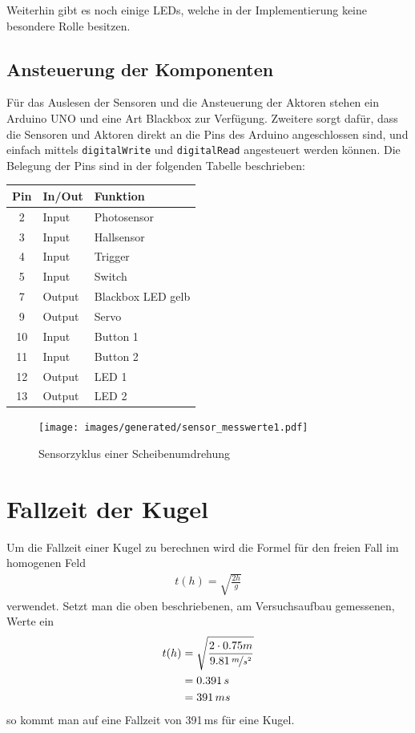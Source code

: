 Weiterhin gibt es noch einige LEDs, welche in der Implementierung keine besondere Rolle besitzen.

\subsection{Ansteuerung der Komponenten}
Für das Auslesen der Sensoren und die Ansteuerung der Aktoren stehen ein Arduino UNO und eine Art Blackbox zur Verfügung.
Zweitere sorgt dafür, dass die Sensoren und Aktoren direkt an die Pins des Arduino angeschlossen sind, und einfach mittels \texttt{digitalWrite} und \texttt{digitalRead} angesteuert werden können.
Die Belegung der Pins sind in der folgenden Tabelle beschrieben:


\begin{center}
\begin{tabular}{cll} 
	\textbf{Pin} 	& \textbf{In/Out} & \textbf{Funktion}	\\
	\toprule
	2 &	Input &	Photosensor \\
	3 &	Input &	Hallsensor\\
	4 &	Input &	Trigger\\
	5 &	Input &	Switch\\
	7 &	Output &	Blackbox LED gelb\\
	9 &	Output &	Servo\\
	10 &	Input &	Button 1\\
	11 &	Input &	Button 2\\
	12 &	Output &	LED 1\\
	13 &	Output &	LED 2\\
	\bottomrule
\end{tabular}
\end{center}

\begin{figure}[h] \centering
	\texttt{[image: images/generated/sensor\_messwerte1.pdf]}
	\caption{Sensorzyklus einer Scheibenumdrehung}
	\label{img:sensorwerte}
\end{figure}

\section{Fallzeit der Kugel}\label{analyse_fallzeit}
Um die Fallzeit einer Kugel zu berechnen wird die Formel für den freien Fall im homogenen Feld
\begin{align}
	t(h) = \sqrt{\frac{2h}{g}}
\end{align}
verwendet.
Setzt man die oben beschriebenen, am Versuchsaufbau gemessenen, Werte ein
\begin{align}
t(h) &= \sqrt{\frac{2 \cdot 0.75m}{9.81\,\nicefrac{m}{s^2}}} \\
	 &= 0.391\,s \\
	 &= 391\,ms
\end{align}
so kommt man auf eine Fallzeit von 391\,ms für eine Kugel.

